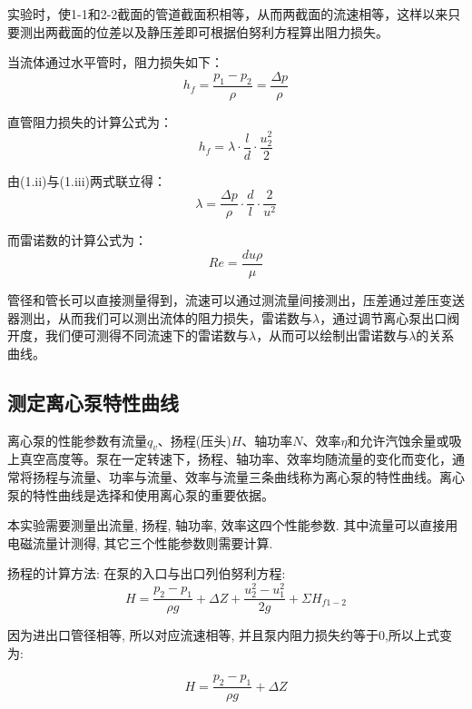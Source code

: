 \documentclass[a4paper,UTF8]{ctexrep}
\theoremstyle{plain}
\theoremstyle{definition}
\numberwithin{equation}{chapter}
\begin{document}
实验时，使1-1和2-2截面的管道截面积相等，从而两截面的流速相等，这样以来只要测出两截面的位差以及静压差即可根据伯努利方程算出阻力损失。

当流体通过水平管时，阻力损失如下：
\begin{equation}
    h_f = \frac{p_1 - p_2}{\rho}= \frac{\Delta p}{\rho}
\end{equation}

直管阻力损失的计算公式为：
\begin{equation}
    h_f = \lambda \cdot \frac{l}{d} \cdot \frac{u_2^2}{2} 
\end{equation}

由(1.ii)与(1.iii)两式联立得：
\begin{equation}
    \lambda = \frac{\Delta p}{\rho}\cdot \frac{d}{l} \cdot \frac{2}{u^2}
\end{equation}

而雷诺数的计算公式为：
\begin{equation}
    Re = \frac{du\rho}{\mu}
\end{equation}

管径和管长可以直接测量得到，流速可以通过测流量间接测出，压差通过差压变送器测出，从而我们可以测出流体的阻力损失，雷诺数与$\lambda$，通过调节离心泵出口阀开度，我们便可测得不同流速下的雷诺数与$\lambda$，从而可以绘制出雷诺数与$\lambda$的关系曲线。
\subsection{测定离心泵特性曲线}
离心泵的性能参数有流量$q_v$、扬程(压头)$H$、轴功率$N$、效率$\eta$和允许汽蚀余量或吸上真空高度等。泵在一定转速下，扬程、轴功率、效率均随流量的变化而变化，通常将扬程与流量、功率与流量、效率与流量三条曲线称为离心泵的特性曲线。离心泵的特性曲线是选择和使用离心泵的重要依据。

本实验需要测量出流量, 扬程, 轴功率, 效率这四个性能参数. 其中流量可以直接用电磁流量计测得, 其它三个性能参数则需要计算. 

扬程的计算方法: 在泵的入口与出口列伯努利方程:
\begin{equation}
    H=\frac{p_2-p_1}{\rho g}+\Delta Z + \frac{u^2_2-u^2_1}{2g}+\Sigma H_{f1-2}
\end{equation}

因为进出口管径相等, 所以对应流速相等, 并且泵内阻力损失约等于0,所以上式变为:

\begin{equation}
    H=\frac{p_2-p_1}{\rho g}+\Delta Z
\end{equation}
\end{document}
